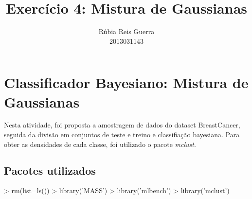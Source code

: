 \documentclass{article}
\title{Exercício 4: Mistura de Gaussianas}
\author{Rúbia Reis Guerra \\ 2013031143}
\begin{document}

\maketitle

\section{Classificador Bayesiano: Mistura de Gaussianas}
Nesta atividade, foi proposta a amostragem de dados do dataset BreastCancer, seguida da divisão em conjuntos de teste e treino e classifiação bayesiana. Para obter as densidades de cada classe, foi utilizado o pacote \textit{mclust}.

\subsection{Pacotes utilizados}
\begin{Schunk}
\begin{Sinput}
> rm(list=ls())
> library('MASS')
> library('mlbench')
> library('mclust')
\end{Sinput}
\end{Schunk}
\end{document}
